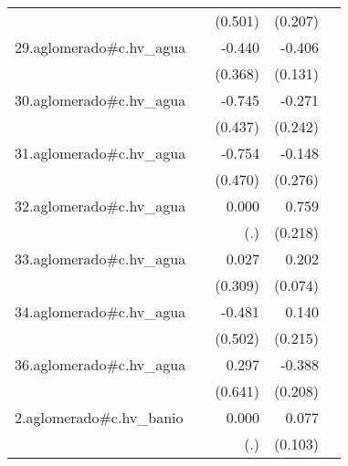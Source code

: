 {\begin{longtable}{l*{4}{D{.}{.}{-1}}}
            &                     &     (0.501)         &     (0.207)         &                     \\
\addlinespace
29.aglomerado#c.hv\_agua&                     &      -0.440         &      -0.406\sym{**} &                     \\
            &                     &     (0.368)         &     (0.131)         &                     \\
\addlinespace
30.aglomerado#c.hv\_agua&                     &      -0.745         &      -0.271         &                     \\
            &                     &     (0.437)         &     (0.242)         &                     \\
\addlinespace
31.aglomerado#c.hv\_agua&                     &      -0.754         &      -0.148         &                     \\
            &                     &     (0.470)         &     (0.276)         &                     \\
\addlinespace
32.aglomerado#c.hv\_agua&                     &       0.000         &       0.759\sym{***}&                     \\
            &                     &         (.)         &     (0.218)         &                     \\
\addlinespace
33.aglomerado#c.hv\_agua&                     &       0.027         &       0.202\sym{**} &                     \\
            &                     &     (0.309)         &     (0.074)         &                     \\
\addlinespace
34.aglomerado#c.hv\_agua&                     &      -0.481         &       0.140         &                     \\
            &                     &     (0.502)         &     (0.215)         &                     \\
\addlinespace
36.aglomerado#c.hv\_agua&                     &       0.297         &      -0.388         &                     \\
            &                     &     (0.641)         &     (0.208)         &                     \\
\addlinespace
2.aglomerado#c.hv\_banio&                     &       0.000         &       0.077         &                     \\
            &                     &         (.)         &     (0.103)         &                     \\

\end{longtable}}
